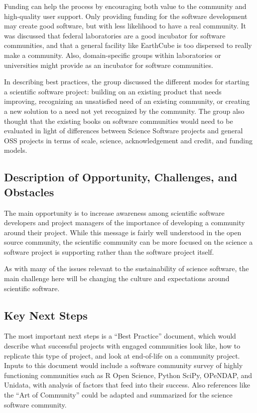 Funding can help the process by encouraging both value to the community and
high-quality user support. Only providing funding for the software development
may create good software, but with less likelihood to have a real community. It
was discussed that federal laboratories are a good incubator for software
communities, and that a general facility like EarthCube is too dispersed to
really make a community. Also, domain-specific groups within laboratories or
universities might provide as an incubator for software communities.

In describing best practices, the group discussed the different modes for
starting a scientific software project: building on an existing product that
needs improving, recognizing an unsatisfied need of an existing community, or
creating a new solution to a need not yet recognized by the community. The group
also thought that the existing books on software communities would need to be
evaluated in light of differences between Science Software projects and general
OSS projects in terms of scale, science, acknowledgement and credit, and funding
models.


\subsection{Description of Opportunity, Challenges, and Obstacles}

The main opportunity is to increase awareness among scientific
software developers and project managers of the importance of
developing a community around their project.
While this message is fairly well understood in the open source
community, the scientific community can be more focused on the
science a software project is supporting rather than the software
project itself.

As with many of the issues relevant to the sustainability of science
software, the main challenge here will be changing the culture and
expectations around scientific software.

\subsection{Key Next Steps}

The most important next steps is a ``Best Practice'' document, which would
describe what successful projects with engaged communities look like, how to
replicate this type of project, and look at end-of-life on a community project.
Inputs to this document would include a software community survey of highly
functioning communities such as R Open Science, Python SciPy, OPeNDAP, and
Unidata, with analysis of factors that feed into their success. Also references
like the ``Art of Community'' could be adapted and summarized for the science
software community.

